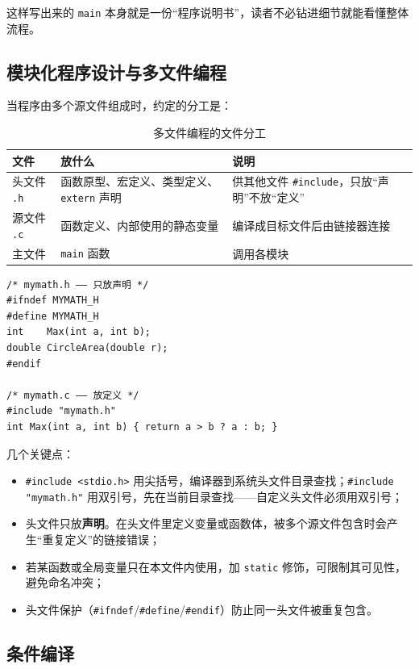 这样写出来的 \texttt{main} 本身就是一份“程序说明书”，读者不必钻进细节就能看懂整体流程。

\subsection{模块化程序设计与多文件编程}

当程序由多个源文件组成时，约定的分工是：

\begin{table}[htbp]
\centering
\caption{多文件编程的文件分工}
\small
\begin{tabularx}{\textwidth}{@{}lXX@{}}
\toprule
文件 & 放什么 & 说明 \\
\midrule
头文件 \texttt{.h} & 函数原型、宏定义、类型定义、\texttt{extern} 声明 & 供其他文件 \texttt{\#include}，只放“声明”不放“定义” \\
源文件 \texttt{.c} & 函数定义、内部使用的静态变量 & 编译成目标文件后由链接器连接 \\
主文件 & \texttt{main} 函数 & 调用各模块 \\
\bottomrule
\end{tabularx}
\end{table}

\begin{lstlisting}
/* mymath.h —— 只放声明 */
#ifndef MYMATH_H
#define MYMATH_H
int    Max(int a, int b);
double CircleArea(double r);
#endif

/* mymath.c —— 放定义 */
#include "mymath.h"
int Max(int a, int b) { return a > b ? a : b; }
\end{lstlisting}

几个关键点：

\begin{itemize}
  \item \texttt{\#include <stdio.h>} 用尖括号，编译器到系统头文件目录查找；\texttt{\#include "mymath.h"} 用双引号，先在当前目录查找——自定义头文件必须用双引号；
  \item 头文件只放\textbf{声明}。在头文件里定义变量或函数体，被多个源文件包含时会产生“重复定义”的链接错误；
  \item 若某函数或全局变量只在本文件内使用，加 \texttt{static} 修饰，可限制其可见性，避免命名冲突；
  \item 头文件保护（\texttt{\#ifndef}/\texttt{\#define}/\texttt{\#endif}）防止同一头文件被重复包含。
\end{itemize}

\subsection{条件编译}

